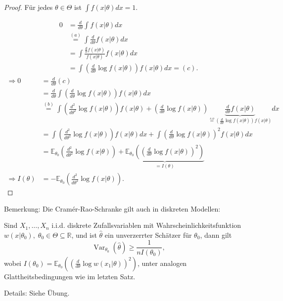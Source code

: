 \documentclass{tstextbook}
\DeclareMathOperator{\Var}{Var}
\newcommand{\E}{\mathbb E}
\newcommand{\R}{\mathbb R}
\begin{document}
\begin{proof}
	Für jedes $ \theta\in\Theta $ ist $ \int f(x|\theta)dx = 1 $. 
	
	\[
	\begin{aligned}
		0 & = \frac{d}{d\theta}\int f(x|\theta) dx \\
		& \overset{(a)}{=} \int \frac{d}{d\theta} f(x|\theta) dx \\
		& = \int \frac{\frac{d}{\theta}f(x|\theta)}{f(x|\theta)}f(x|\theta) dx \\
		& = \int \left(\frac{d}{d\theta} \log f(x|\theta)\right) f(x|\theta) dx = (c).
	\end{aligned}
	\]
	\[\begin{aligned}
	\Rightarrow 0 & = \frac{d}{d\theta} (c) \\
	& = \frac{d}{d\theta}\int \left(\frac{d}{d\theta} \log f(x|\theta)\right) f(x|\theta) dx \\
	& \overset{(b)}{=} \int \left(\frac{d^2}{d\theta^2} \log f(x|\theta)\right) f(x|\theta) + \left(\frac{d}{d\theta}\log f(x|\theta)\right) \underbrace{\frac{d}{d\theta} f(x|\theta)}_{\overset{s.o}{=}\left(\frac{d}{d\theta}\log f(x|\theta)\right)f(x|\theta)} dx \\
	& = \int \left(\frac{d^2}{d\theta^2} \log f(x|\theta)\right) f(x|\theta) dx + \int \left(\frac{d}{d\theta}\log f(x|\theta)\right)^2 f(x|\theta) dx \\
	& = \E_{\theta_0} \left(\frac{d^2}{d\theta^2}\log f(x|\theta)\right)+\underbrace{\E_{\theta_0}\left(\left(\frac{d}{d\theta}\log f(x|\theta)\right)^2\right)}_{=I(\theta)} \\
	\Rightarrow I(\theta) & = - \E_{\theta_0}\left(\frac{d^2}{d\theta^2}\log f(x|\theta)\right). 
	\end{aligned}
	\]
	
	
\end{proof}


\begin{remark}
	Bemerkung: Die Cramér-Rao-Schranke gilt auch in diskreten Modellen: 
	
	Sind $ X_1,\ldots,X_n $ i.i.d. diskrete Zufallsvariablen mit Wahrscheinlichkeitsfunktion $ w(x|\theta_0), \; \theta_0\in\Theta\subseteq\R $, und ist $ \hat{\theta} $ ein unverzerrter Schätzer für $ \theta_0 $, dann gilt 
	\[
	\Var_{\theta_0}(\hat{\theta}) \ge \frac{1}{nI(\theta_0)},
	\] 
	wobei $ I(\theta_0) = \E_{\theta_0} \left(\left(\frac{d}{d\theta} \log w(x_1|\theta)\right)^2\right) $, unter analogen Glattheitsbedingungen wie im letzten Satz. 
	
	Details: Siehe Übung.
\end{remark}
\end{document}
